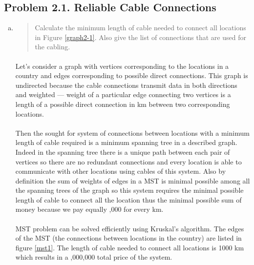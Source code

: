 \subsection{Problem 2.1. Reliable Cable Connections}
\begin{enumerate}[(a)]
\item \begin{quote}Calculate the minimum length of cable needed to connect all locations in Figure
\ref{graph2-1}. Also give the list of connections that are used for the cabling.\end{quote}

\paragraph{}
	Let's consider a graph with vertices corresponding to the locations in a country and edges corresponding to possible direct connections. This graph is undirected because the cable connections transmit data in both directions and weighted --- weight of a particular edge connecting two vertices is a length of a possible direct connection in km between two corresponding locations.

\paragraph{}
	Then the sought for system of connections between locations with a minimum length of cable required is a minimum spanning tree in a described graph. Indeed in the spanning tree there is a unique path between each pair of vertices so there are no redundant connections and every location is able to communicate with other locations using cables of this system. Also by definition the sum of weights of edges in a MST is minimal possible among all the spanning trees of the graph so this system requires the minimal possible length of cable to connect all the location thus the minimal possible sum of money because we pay equally ,000 for every km.

\paragraph{}
	MST problem can be solved efficiently using Kruskal's algorithm. The edges of the MST (the connections between locations in the country) are listed in figure \ref{mst1}. The length of cable needed to connect all locations is 1000 km which results in a ,000,000 total price of the system.


\end{enumerate}
